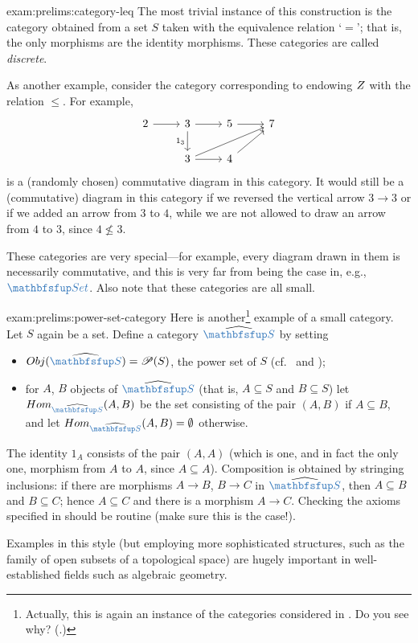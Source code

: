 \begin{exam}{}{exam:prelims:category-leq}
  The most trivial instance of this construction is the category
  obtained from a set $S$ taken with the equivalence relation `$=$';
  that is, the only morphisms are the identity morphisms. These
  categories are called \emph{discrete}.

  As another example, consider the category corresponding to endowing
  $Z$ with the relation $\leq$. For example,
  \[
    \begin{tikzcd}
      2 \arrow[r] & 3 \arrow[r] \arrow[d, "1_3"'] & 5 \arrow[r] & 7 \\
      & 3 \arrow[urr] \arrow[r] & 4 \arrow[ur] &
    \end{tikzcd}
  \]
  is a (randomly chosen) commutative diagram in this category. It
  would still be a (commutative) diagram in this category if we
  reversed the vertical arrow $3 \to 3$ or if we added an arrow from
  $3$ to $4$, while we are not allowed to draw an arrow from $4$ to
  $3$, since $4 \not\leq 3$.

  These categories are very special---for example, every diagram drawn
  in them is necessarily commutative, and this is very far from being
  the case in, e.g., $\categ{Set}$. Also note that these categories
  are all small.
\end{exam}
\begin{exam}{}{exam:prelims:power-set-category}
  Here is another\footnote{Actually, this is again an instance of the
    categories considered in . Do you
    see why?  (.)} example of a
  small category. Let $S$ again be a set. Define a category
  $\widehat{\categ{S}}$ by setting
  \begin{itemize}
  \item $\Obj(\widehat{\categ{S}}) = \mathscr{P}(S)$, the power set of $S$
    (cf.\  and
    );
  \item for $A$, $B$ objects of $\widehat{\categ{S}}$ (that is,
    $A \subseteq S$ and $B \subseteq S$) let
    $\Hom_{\widehat{\categ{S}}}(A, B)$ be the set consisting of the
    pair $(A, B)$ if
    $A \subseteq B$, and let
    $\Hom_{\widehat{\categ{S}}}(A, B) = \emptyset$ otherwise.
  \end{itemize}
  The identity $1_A$ consists of the pair $(A, A)$ (which is one, and
  in fact the only one, morphism from $A$ to $A$, since
  $A \subseteq A$). Composition is obtained by stringing inclusions:
  if there are morphisms $A \to B$, $B \to C$ in $\widehat{\categ{S}}$,
  then $A \subseteq B$ and $B \subseteq C$; hence $A \subseteq C$ and
  there is a morphism $A \to C$. Checking the axioms specified in
   should be routine
  (make sure this is the case!).

  Examples in this style (but employing more sophisticated structures,
  such as the family of open subsets of a topological space) are
  hugely important in well-established fields such as algebraic
  geometry.
\end{exam}
